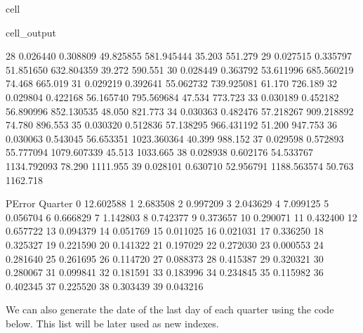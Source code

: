 \documentclass[letterpaper,10pt,english]{jupyterBook}
\begin{document}
\begin{sphinxuseclass}{cell}
\begin{sphinxVerbatimOutput}
\begin{sphinxuseclass}{cell_output}
\begin{sphinxVerbatim}[commandchars=\\\{\}]
28       0.026440  0.308809  49.825855   581.945444  35.203           551.279   
29       0.027515  0.335797  51.851650   632.804359  39.272           590.551   
30       0.028449  0.363792  53.611996   685.560219  74.468           665.019   
31       0.029219  0.392641  55.062732   739.925081  61.170           726.189   
32       0.029804  0.422168  56.165740   795.569684  47.534           773.723   
33       0.030189  0.452182  56.890996   852.130535  48.050           821.773   
34       0.030363  0.482476  57.218267   909.218892  74.780           896.553   
35       0.030320  0.512836  57.138295   966.431192  51.200           947.753   
36       0.030063  0.543045  56.653351  1023.360364  40.399           988.152   
37       0.029598  0.572893  55.777094  1079.607339  45.513          1033.665   
38       0.028938  0.602176  54.533767  1134.792093  78.290          1111.955   
39       0.028101  0.630710  52.956791  1188.563574  50.763          1162.718   

            PError  
Quarter             
0       \PYGZhy{}12.602588  
1        \PYGZhy{}2.683508  
2        \PYGZhy{}0.997209  
3        \PYGZhy{}2.043629  
4        \PYGZhy{}7.099125  
5         0.056704  
6        \PYGZhy{}0.666829  
7        \PYGZhy{}1.142803  
8        \PYGZhy{}0.742377  
9        \PYGZhy{}0.373657  
10       \PYGZhy{}0.290071  
11       \PYGZhy{}0.432400  
12       \PYGZhy{}0.657722  
13       \PYGZhy{}0.094379  
14       \PYGZhy{}0.051769  
15       \PYGZhy{}0.011025  
16       \PYGZhy{}0.021031  
17       \PYGZhy{}0.336250  
18        0.325327  
19        0.221590  
20       \PYGZhy{}0.141322  
21       \PYGZhy{}0.197029  
22        0.272030  
23        0.000553  
24       \PYGZhy{}0.281640  
25       \PYGZhy{}0.261695  
26        0.114720  
27       \PYGZhy{}0.088373  
28       \PYGZhy{}0.415387  
29       \PYGZhy{}0.320321  
30        0.280067  
31        0.099841  
32       \PYGZhy{}0.181591  
33       \PYGZhy{}0.183996  
34        0.234845  
35       \PYGZhy{}0.115982  
36       \PYGZhy{}0.402345  
37       \PYGZhy{}0.225520  
38        0.303439  
39       \PYGZhy{}0.043216  
\end{sphinxVerbatim}

\end{sphinxuseclass}\end{sphinxVerbatimOutput}

\end{sphinxuseclass}
\sphinxAtStartPar
We can also generate the date of the last day of each quarter using the code below. This list will be later used as new indexes.
\end{document}
